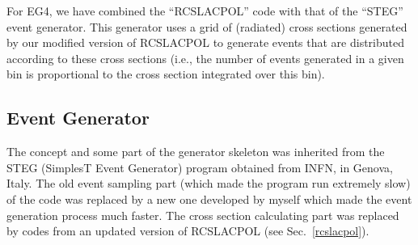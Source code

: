 
For EG4, we have combined the %
``RCSLACPOL'' code with that of the ``STEG'' event generator. This generator uses a grid of (radiated) cross sections generated by our modified version of RCSLACPOL to generate events that are distributed according to these cross sections %
(i.e., the number of events generated in a given bin is proportional to the cross section integrated over this bin).


\subsection{Event Generator}
\label{evGen}


The concept and some part of the generator skeleton was inherited from the STEG (SimplesT Event Generator) %
 program obtained from INFN, in Genova, Italy. The old event sampling part (which made the program run extremely slow) of the code was replaced by a new one developed by myself which made the event generation process much faster. %
The cross section calculating part was replaced by codes from an updated version of RCSLACPOL (see Sec.~\ref{rcslacpol}).


